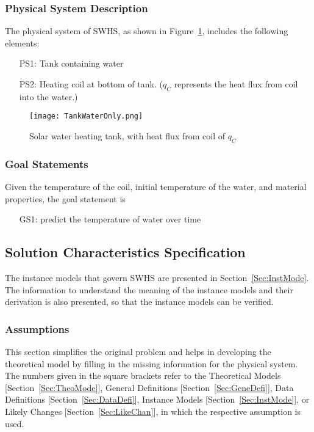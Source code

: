 \documentclass[12pt]{article}
\begin{document}
\subsubsection{Physical System Description}
\label{Sec:PhysSystDesc}
The physical system of SWHS, as shown in Figure~\ref{Figure:Solawateheattankwithheatfluxfromcoilof}, includes the following elements:
\begin{itemize}
\item[PS1:]Tank containing water
\item[PS2:]Heating coil at bottom of tank. ($q_{C}$ represents the heat flux from coil into the water.)
\end{itemize}
\begin{figure}
\begin{center}
\texttt{[image: TankWaterOnly.png]}
\caption{Solar water heating tank, with heat flux from coil of $q_{C}$}
\label{Figure:Solawateheattankwithheatfluxfromcoilof}
\end{center}
\end{figure}
\subsubsection{Goal Statements}
\label{Sec:GoalStat}
Given the temperature of the coil, initial temperature of the water, and material properties, the goal statement is
\begin{itemize}
\item[GS1:]predict the temperature of water over time
\end{itemize}
\subsection{Solution Characteristics Specification}
\label{Sec:SoluCharSpec}
The instance models that govern SWHS are presented in Section~\ref{Sec:InstMode}. The information to understand the meaning of the instance models and their derivation is also presented, so that the instance models can be verified.
\subsubsection{Assumptions}
\label{Sec:Assu}
This section simplifies the original problem and helps in developing the theoretical model by filling in the missing information for the physical system. The numbers given in the square brackets refer to the Theoretical Models [Section~\ref{Sec:TheoMode}], General Definitions [Section~\ref{Sec:GeneDefi}], Data Definitions [Section~\ref{Sec:DataDefi}], Instance Models [Section~\ref{Sec:InstMode}], or Likely Changes [Section~\ref{Sec:LikeChan}], in which the respective assumption is used.
\end{document}
